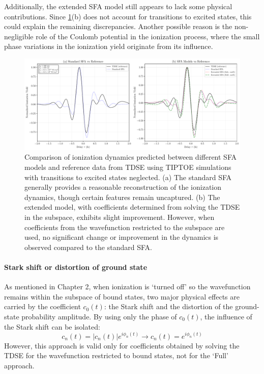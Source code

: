 \medskip
Additionally, the extended SFA model still appears to lack some physical contributions.
Since \ref{fig:tiptoe_sfa_comparison}(b) does not account for transitions to excited states, this could explain the remaining discrepancies.
Another possible reason is the non-negligible role of the Coulomb potential in the ionization process, where the small phase variations in the ionization yield originate from its influence.

\begin{figure}[htbp]
    \centering
    \includegraphics[width=1\textwidth]{figures/2plot_SFA-comparison_1_BA.pdf}
    \caption[Comparison of ionization dynamics predicted by SFA models and TDSE]{Comparison of ionization dynamics predicted between different SFA models and reference data from TDSE using TIPTOE simulations with transitions to excited states neglected.  
            (a) The standard SFA generally provides a reasonable reconstruction of the ionization dynamics, though certain features remain uncaptured.  
            (b) The extended model, with coefficients determined from solving the TDSE in the subspace, exhibits slight improvement. However, when coefficients from the wavefunction restricted to the subspace are used, no significant change or improvement in the dynamics is observed compared to the standard SFA.}  
    \label{fig:tiptoe_sfa_comparison}
\end{figure}

\paragraph{Stark shift or distortion of ground state}
As mentioned in Chapter 2, when ionization is `turned off' so the wavefunction remains within the subspace of bound states, two major physical effects are carried by the coefficient $c_0(t)$: the Stark shift and the distortion of the ground-state probability amplitude. By using only the phase of $c_0(t)$, the influence of the Stark shift can be isolated: \begin{equation} c_n(t) = |c_n(t)|e^{i \phi_n(t)} \rightarrow c_n(t) = e^{i \phi_n(t)} \end{equation} However, this approach is valid only for coefficients obtained by solving the TDSE for the wavefunction restricted to bound states, not for the `Full' approach.


